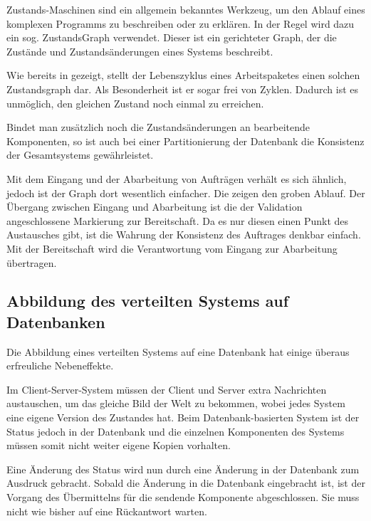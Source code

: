\nocite{statechart}

Zustands-Maschinen sind ein allgemein bekanntes Werkzeug,
um den Ablauf eines komplexen Programms zu beschreiben oder zu erklären.
In der Regel wird dazu ein sog. ZustandsGraph verwendet.
Dieser ist ein gerichteter Graph, der die Zustände und Zustandsänderungen eines Systems beschreibt.

Wie bereits in  gezeigt,
stellt der Lebenszyklus eines Arbeitspaketes einen solchen Zustandsgraph dar.
Als Besonderheit ist er sogar frei von Zyklen.
Dadurch ist es unmöglich, den gleichen Zustand noch einmal zu erreichen.

Bindet man zusätzlich noch die Zustandsänderungen an bearbeitende Komponenten,
so ist auch bei einer Partitionierung der Datenbank die Konsistenz der Gesamtsystems gewährleistet.


Mit dem Eingang und der Abarbeitung von Aufträgen verhält es sich ähnlich,
jedoch ist der Graph dort wesentlich einfacher.
Die  zeigen den groben Ablauf.
Der Übergang zwischen Eingang und Abarbeitung ist die der Validation angeschlossene Markierung zur Bereitschaft.
Da es nur diesen einen Punkt des Austausches gibt, ist die Wahrung der Konsistenz des Auftrages denkbar einfach.
Mit der Bereitschaft wird die Verantwortung vom Eingang zur Abarbeitung übertragen.

\subsection{Abbildung des verteilten Systems auf Datenbanken}

Die Abbildung eines verteilten Systems auf eine Datenbank
hat einige überaus erfreuliche Nebeneffekte.

Im Client-Server-System müssen der Client und Server extra Nachrichten austauschen, um das gleiche Bild der Welt zu bekommen, wobei jedes System eine eigene Version des Zustandes hat.
Beim Datenbank-basierten System ist der Status jedoch in der Datenbank und
die einzelnen Komponenten des Systems müssen somit nicht weiter eigene Kopien vorhalten.

Eine Änderung des Status wird nun durch eine Änderung in der Datenbank zum Ausdruck gebracht.
Sobald die Änderung in die Datenbank eingebracht ist,
ist der Vorgang des Übermittelns für die sendende Komponente abgeschlossen.
Sie muss nicht wie bisher auf eine Rückantwort warten.


